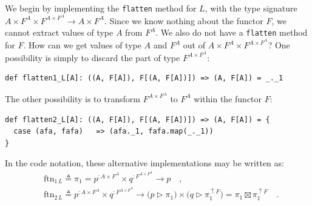 We begin by implementing the \lstinline!flatten! method for $L$,
with the type signature $A\times F^{A}\times F^{A\times F^{A}}\rightarrow A\times F^{A}$.
Since we know nothing about the functor $F$, we cannot extract values
of type $A$ from $F^{A}$. We also do not have a \lstinline!flatten!
method for $F$. How can we get values of type $A$ and $F^{A}$ out
of $A\times F^{A}\times F^{A\times F^{A}}$? One possibility is simply
to discard the part of type $F^{A\times F^{A}}$:
\begin{lstlisting}
def flatten1_L[A]: ((A, F[A]), F[(A, F[A])]) => (A, F[A]) = _._1
\end{lstlisting}
The other possibility is to transform $F^{A\times F^{A}}$ to $F^{A}$
within the functor $F$:
\begin{lstlisting}
def flatten2_L[A]: ((A, F[A]), F[(A, F[A])]) => (A, F[A]) = {
  case (afa, fafa)   => (afa._1, fafa.map(_._1))
}
\end{lstlisting}
In the code notation, these alternative implementations may be written
as:
\begin{align*}
 & \text{ftn}_{1\,L}\triangleq\pi_{1}=p^{:A\times F^{A}}\times q^{:F^{A\times F^{A}}}\rightarrow p\quad,\\
 & \text{ftn}_{2\,L}\triangleq p^{:A\times F^{A}}\times q^{:F^{A\times F^{A}}}\rightarrow\big(p\triangleright\pi_{1}\big)\times\big(q\triangleright\pi_{1}^{\uparrow F}\big)=\pi_{1}\boxtimes\pi_{1}^{\uparrow F}\quad.
\end{align*}

